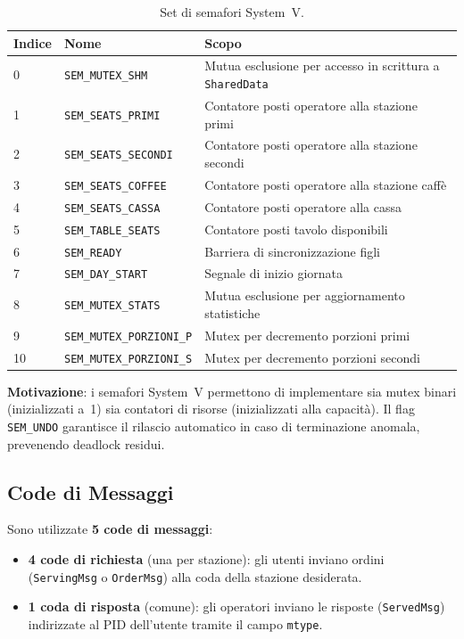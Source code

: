 \documentclass[a4paper,12pt]{article}
\begin{document}
\begin{table}[H]
\centering
\caption{Set di semafori System~V.}
\begin{tabular}{@{}llp{7.5cm}@{}}
\toprule
\textbf{Indice} & \textbf{Nome} & \textbf{Scopo} \\
\midrule
0  & \texttt{SEM\_MUTEX\_SHM}       & Mutua esclusione per accesso in scrittura a \texttt{SharedData} \\
1  & \texttt{SEM\_SEATS\_PRIMI}     & Contatore posti operatore alla stazione primi \\
2  & \texttt{SEM\_SEATS\_SECONDI}   & Contatore posti operatore alla stazione secondi \\
3  & \texttt{SEM\_SEATS\_COFFEE}    & Contatore posti operatore alla stazione caffè \\
4  & \texttt{SEM\_SEATS\_CASSA}     & Contatore posti operatore alla cassa \\
5  & \texttt{SEM\_TABLE\_SEATS}     & Contatore posti tavolo disponibili \\
6  & \texttt{SEM\_READY}            & Barriera di sincronizzazione figli \\
7  & \texttt{SEM\_DAY\_START}       & Segnale di inizio giornata \\
8  & \texttt{SEM\_MUTEX\_STATS}     & Mutua esclusione per aggiornamento statistiche \\
9  & \texttt{SEM\_MUTEX\_PORZIONI\_P} & Mutex per decremento porzioni primi \\
10 & \texttt{SEM\_MUTEX\_PORZIONI\_S} & Mutex per decremento porzioni secondi \\
\bottomrule
\end{tabular}
\end{table}

\textbf{Motivazione}: i semafori System~V permettono di implementare
sia mutex binari (inizializzati a~1) sia contatori di risorse
(inizializzati alla capacità). Il flag \texttt{SEM\_UNDO} garantisce
il rilascio automatico in caso di terminazione anomala, prevenendo
deadlock residui.

\subsection{Code di Messaggi}

Sono utilizzate \textbf{5 code di messaggi}:
\begin{itemize}
  \item \textbf{4 code di richiesta} (una per stazione): gli utenti
        inviano ordini (\texttt{ServingMsg} o \texttt{OrderMsg}) alla
        coda della stazione desiderata.
  \item \textbf{1 coda di risposta} (comune): gli operatori inviano
        le risposte (\texttt{ServedMsg}) indirizzate al PID dell'utente
        tramite il campo \texttt{mtype}.
\end{itemize}
\end{document}
